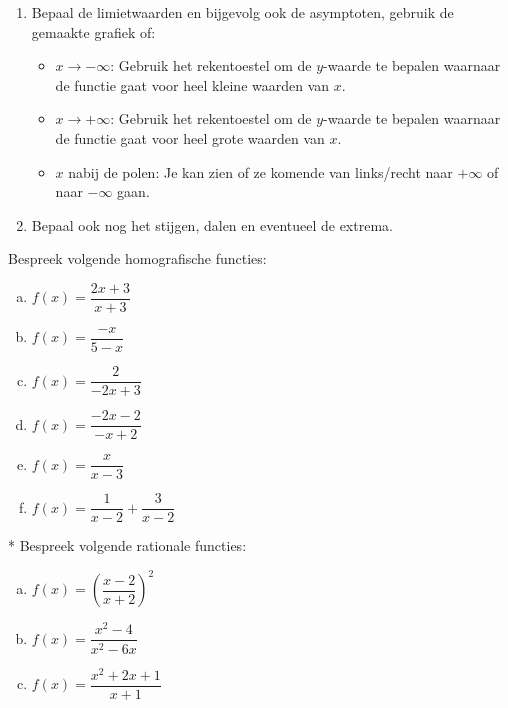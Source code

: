 \documentclass[12pt]{article}
\begin{document}
\begin{enumerate}
  \item Bepaal de limietwaarden en bijgevolg ook de asymptoten, gebruik de gemaakte grafiek of:
  \begin{itemize}
  \scriptsize
    \item $x\to-\infty$: Gebruik het rekentoestel om de $y$-waarde te bepalen waarnaar de functie gaat voor heel kleine waarden van $x$.
    \item $x\to+\infty$: Gebruik het rekentoestel om de $y$-waarde te bepalen waarnaar de functie gaat voor heel grote waarden van $x$.
    \item $x$ nabij de polen: Je kan zien of ze komende van links/recht naar $+\infty$ of naar $-\infty$ gaan.
  \end{itemize}
  \item Bepaal ook nog het stijgen, dalen en eventueel de extrema.
\end{enumerate}

\begin{oefening}
Bespreek volgende homografische functies:\\
\begin{enumerate}[(a)]
  \itemsep1em
  \item $f(x)=\dfrac{2x+3}{x+3}$
  \item $f(x)=\dfrac{-x}{5-x}$
  \item $f(x)=\dfrac{2}{-2x+3}$
  \item $f(x)=\dfrac{-2x-2}{-x+2}$
  \item $f(x)=\dfrac{x}{x-3}$
  \item $f(x)=\dfrac{1}{x-2}+\dfrac{3}{x-2}$
\end{enumerate}
\end{oefening}

\begin{oefening}*
Bespreek volgende rationale functies:\\
\begin{enumerate}[(a)]
  \itemsep1em
  \item $f(x)=\left(\dfrac{x-2}{x+2}\right)^2$
  \item $f(x)=\dfrac{x^2-4}{x^2-6x}$
  \item $f(x)=\dfrac{x^2+2x+1}{x+1}$
\end{enumerate}
\end{oefening}
\end{document}
